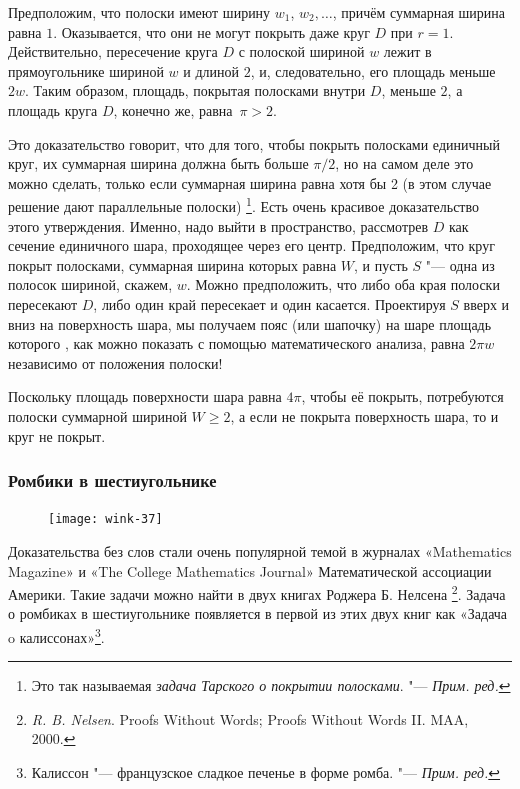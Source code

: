 \documentclass[twoside]{book}
\begin{document}
Предположим, что полоски имеют ширину $w_1$, $w_2,\dots$, причём суммарная ширина равна $1$.
Оказывается, что они не могут покрыть даже круг $D$ при $r=1$.
Действительно, пересечение круга $D$ с полоской шириной $w$ лежит в прямоугольнике шириной $w$ и длиной $2$, и, следовательно, его площадь меньше $2w$.
Таким образом, площадь, покрытая полосками внутри $D$, меньше $2$, а
площадь круга $D$, конечно же, равна~$\pi>2$.
\heart 

\medskip

Это доказательство говорит, что для того, чтобы покрыть полосками
единичный круг, их суммарная ширина должна быть больше $\pi/2$, но на
самом деле это можно сделать, только если суммарная ширина равна хотя бы 2 (в этом случае решение дают параллельные полоски)%
\footnote{Это так называемая \emph{задача Тарского о покрытии полосками}. "--- \emph{Прим. ред.}}.
Есть очень красивое доказательство этого утверждения.
Именно, надо выйти в пространство, рассмотрев $D$ как сечение единичного шара, проходящее через его центр.
Предположим, что круг покрыт полосками, суммарная ширина которых равна $W$, и пусть $S$ "--- одна из полосок шириной, скажем, $w$.
Можно предположить, что либо оба края полоски пересекают $D$, либо один край пересекает и один касается.
Проектируя $S$ вверх и вниз на поверхность шара, мы получаем пояс (или шапочку)
на шаре площадь которого , как можно показать с помощью
математического анализа, равна 
$2\pi w$ независимо от положения полоски!

Поскольку площадь поверхности шара равна $4\pi$, чтобы её покрыть, потребуются полоски суммарной шириной $W\ge 2$,
а если не покрыта поверхность шара, то и круг не покрыт.


\subsubsection*{Ромбики в шестиугольнике}%

\leavevmode

\begin{figure}[h]
\vspace{-.5\baselineskip}
\centering
\texttt{[image: wink-37]}

\vspace{-\baselineskip}

\heart
\end{figure}




Доказательства без слов стали очень популярной темой в журналах «Mathematics Magazine» и «The College Mathematics Journal» Математической ассоциации Америки.
Такие задачи можно найти в двух книгах Роджера Б. Нелсена%
\footnote{\emph{R. B. Nelsen}. {Proofs Without Words}; {Proofs Without Words II}. MAA, 2000.}.
Задача о ромбиках в шестиугольнике появляется в первой из этих двух
книг как «Задача o калиссонах»\footnote{Калиссон "--- французское сладкое печенье в форме ромба. "--- \emph{Прим. ред.}}.
\end{document}
